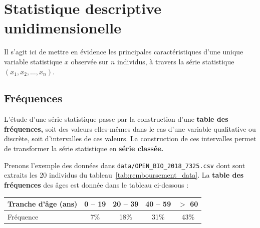 \section{Statistique descriptive unidimensionelle}
Il s'agit ici de mettre en évidence les principales caractéristiques d'une
unique variable statistique $x$ observée sur $n$ individus, à travers la série
statistique $(x_1, x_2, \dots, x_n).$

\subsection{Fréquences}
L'étude d'une série statistique passe par la construction d'une \textbf{table
  des fréquences,} soit des valeurs elles-mêmes dans le cas d'une variable
qualitative ou discrète, soit d'intervalles de ces valeurs. La construction de
ces intervalles permet de transformer la série statistique en \textbf{série
  classée.}

\begin{exemple}
  Prenons l'exemple des données dans
  \texttt{data/OPEN\_BIO\_2018\_7325.csv} dont sont extraits les 20 individus
  du tableau~\ref{tab:remboursement_data}. La \textbf{table des fréquences}
des âges est donnée dans le tableau ci-dessous : \par
    \centering
    \begin{tabular}[h]{|l|c|c|c|c|} \hline 
      Tranche d'âge (ans)   & 0 -- 19 & 20 -- 39  & 40 -- 59  & $>$ 60    \\ \hline     
      Fréquence             & 7\%     & 18\%      & 31\%      & 43\%      \\ \hline
    \end{tabular}    

\end{exemple}

